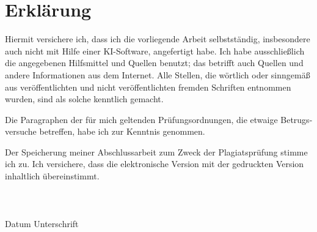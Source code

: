 \documentclass{article}
\begin{document}
	\section{Erklärung}
	Hiermit versichere ich, dass ich die vorliegende Arbeit selbstständig, insbesondere auch nicht mit Hilfe einer KI-Software, angefertigt habe. Ich habe ausschließlich die angegebenen Hilfsmittel und Quellen benutzt; das betrifft auch Quellen und andere Informationen aus dem Internet. Alle Stellen, die wörtlich oder sinngemäß aus veröffentlichten und nicht veröffentlichten fremden Schriften entnommen wurden, sind als solche kenntlich gemacht.

	Die Paragraphen der für mich geltenden Prüfungsordnungen, die etwaige Betrugs-versuche betreffen, habe ich zur Kenntnis genommen.

	Der Speicherung meiner Abschlussarbeit zum Zweck der Plagiatsprüfung stimme ich zu. Ich versichere, dass die elektronische Version mit der gedruckten Version inhaltlich übereinstimmt. \\ \\ \\ \\ 

	\hline
	Datum \quad \quad \quad \quad \quad \quad \quad \quad Unterschrift
\end{document}
